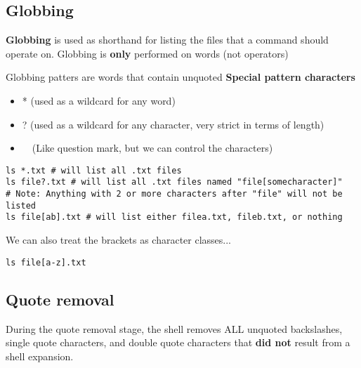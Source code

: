 \documentclass{report}
\begin{document}
  \pagebreak \bigbreak \noindent 
  \subsection{Globbing}
  \bigbreak \noindent 
  \begin{concept}
      \textbf{Globbing} is used as shorthand for listing the files that a command should operate on. Globbing is \textbf{only} performed on words (not operators)
  \end{concept}
  \bigbreak \noindent 
  Globbing patters are words that contain unquoted \textbf{Special pattern characters}
  \begin{itemize}
      \item * (used as a wildcard for any word)
        \item ? (used as a wildcard for any character, very strict in terms of length)
        \item \textlbrackdbl\ \  (Like question mark, but we can control the characters)
  \end{itemize}
  \begin{mdframed}[style=purplebox]
  \begin{verbatim}
ls *.txt # will list all .txt files
ls file?.txt # will list all .txt files named "file[somecharacter]"
# Note: Anything with 2 or more characters after "file" will not be listed
ls file[ab].txt # will list either filea.txt, fileb.txt, or nothing
  \end{verbatim}
  \bigbreak \noindent
  \end{mdframed}
  \bigbreak \noindent 
  We can also treat the brackets as character classes...
  \begin{mdframed}[style=purplebox]
  \begin{verbatim}
ls file[a-z].txt
  \end{verbatim}
  \bigbreak \noindent
  \end{mdframed}

  \bigbreak \noindent 
  \subsection{Quote removal}
  \bigbreak \noindent 
  During the quote removal stage, the shell removes ALL unquoted backslashes, single quote characters, and double quote characters that \textbf{did not} result from a shell expansion.
  \bigbreak \noindent 

  \bigbreak \noindent 
\end{document}
